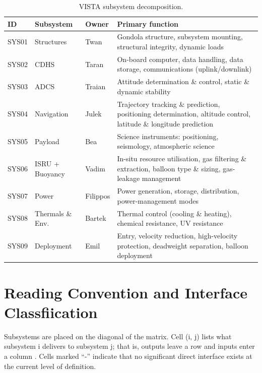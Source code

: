 \begin{table}[ht]
\centering\small
\caption{VISTA subsystem decomposition.}
\label{tab:N2-subsystems}
\begin{tabularx}{\textwidth}{l l l X}
\toprule
\textbf{ID} & \textbf{Subsystem} & \textbf{Owner} & \textbf{Primary function} \\
\midrule
SYS01 & Structures         & Twan     & Gondola structure, subsystem mounting, structural integrity, dynamic loads \\
SYS02 & CDHS               & Taran    & On-board computer, data handling, data storage, communications (uplink/downlink) \\
SYS03 & ADCS               & Traian   & Attitude determination \& control, static \& dynamic stability \\
SYS04 & Navigation          & Julek    & Trajectory tracking \& prediction, positioning determination, altitude control, latitude \& longitude prediction \\
SYS05 & Payload             & Bea      & Science instruments: positioning, seismology, atmospheric science \\
SYS06 & ISRU + Buoyancy     & Vadim    & In-situ resource utilisation, gas filtering \& extraction, balloon type \& sizing, gas-leakage management \\
SYS07 & Power               & Filippos & Power generation, storage, distribution, power-management modes \\
SYS08 & Thermals \& Env.    & Bartek   & Thermal control (cooling \& heating), chemical resistance, UV resistance \\
SYS09 & Deployment          & Emil     & Entry, velocity reduction, high-velocity protection, deadweight separation, balloon deployment \\
\bottomrule
\end{tabularx}
\end{table}

\section{Reading Convention and Interface Classfiication}

Subsystems are placed on the diagonal of the matrix. Cell (i, j) lists what subsystem i delivers to subsystem j; that is, outputs leave a row and inputs enter a column \cite{lano1977}. Cells marked ``-'' indicate that no significant direct interface exists at the current level of definition.

